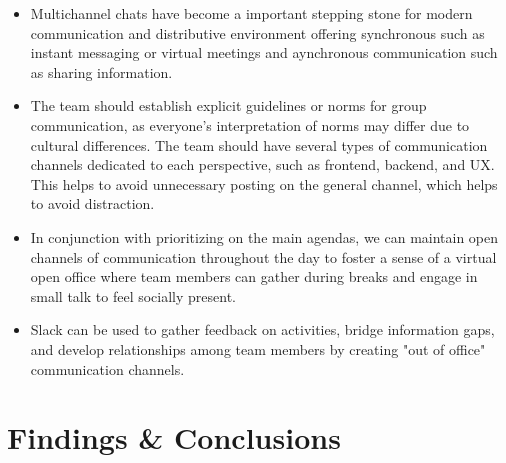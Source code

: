 \documentclass{llncs}
\begin{document}
\begin{itemize}
    \item Multichannel chats have become a important stepping stone for modern communication and distributive environment offering synchronous such as instant messaging or virtual meetings and aynchronous communication such as sharing information.~\cite{refbook1}  \\
    \item The team should establish explicit guidelines or norms for group communication, as everyone's interpretation of norms may differ due to cultural differences. The team should have several types of communication channels dedicated to each perspective, such as frontend, backend, and UX. This helps to avoid unnecessary posting on the general channel, which helps to avoid distraction.~\cite{refpaper9} \\
    \item In conjunction with prioritizing on the main agendas, we can maintain open channels of communication throughout the day to foster a sense of a virtual open office where team members can gather during breaks and engage in small talk to feel socially present. ~\cite{refpaper8}\\
    \item Slack can be used to gather feedback on activities, bridge information gaps, and develop relationships among team members by creating "out of office" communication 
    channels.~\cite{refpaper9}
\end{itemize}


\section{Findings \& Conclusions}
\end{document}
